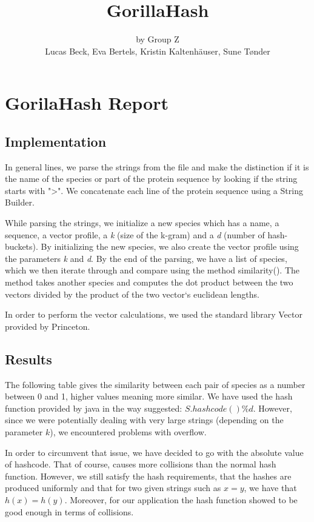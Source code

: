 \documentclass{tufte-handout}
\title{GorillaHash}
\author{by Group Z\\ Lucas Beck, Eva Bertels, Kristin Kaltenh\"{a}user, Sune T\o nder}
\begin{document}
\maketitle

\section{GorilaHash Report}

\subsection{Implementation}
\justify
In general lines, we parse the strings from the file and make the distinction if it is the name of the species or part of the protein sequence by looking if the string starts with ">". We concatenate each line of the protein sequence using a String Builder.

While parsing the strings, we initialize a new species which has a name, a sequence, a vector profile, a \textit{k} (size of the k-gram) and a \textit{d} (number of hash-buckets). By initializing the new species, we also create the vector profile using the parameters \textit{k} and \textit{d}.
By the end of the parsing, we have a list of species, which we then iterate through and compare using the method similarity(). The method takes another species and computes the dot product between the two vectors divided by the product of the two vector`s euclidean lengths.

In order to perform the vector calculations, we used the standard library Vector provided by Princeton.



\subsection{Results}

The following table gives the similarity between each pair of species as a number between 0 and 1, higher values meaning more similar. We have used the hash function provided by java in the way suggested: \begin{math} S.hashcode() \% d\end{math}. However, since we were potentially dealing with very large strings (depending on the parameter \begin{math} k \end{math}), we encountered problems with overflow. 

In order to circumvent that issue, we have decided to go with the absolute value of hashcode. That of course, causes more collisions than the normal hash function. However, we still satisfy the hash requirements, that the hashes are produced uniformly and that for two given strings such as \begin{math} x = y \end{math}, we have that \begin{math} h(x) = h(y) \end{math}. Moreover, for our application the hash function showed to be good enough in terms of collisions.
\end{document}
